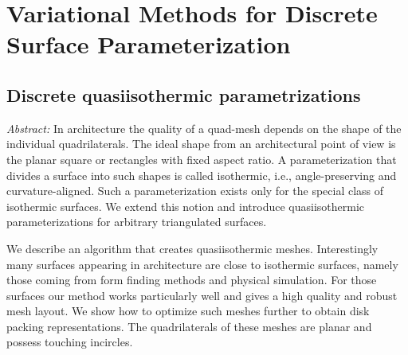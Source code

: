 \chapter{Variational Methods for Discrete Surface Parameterization}

\section{Discrete quasiisothermic parametrizations}

\emph{Abstract:} 
In architecture the quality of a quad-mesh depends on the shape of the individual
quadrilaterals. The ideal shape from an architectural point of view is the
planar square or rectangles with fixed aspect ratio. A parameterization that divides a
surface into such shapes is called isothermic, i.e., angle-preserving and
curvature-aligned. Such a parameterization exists only for the special class of
isothermic surfaces. We extend this notion and introduce quasiisothermic
parameterizations for arbitrary triangulated  surfaces.

We describe an algorithm that creates quasiisothermic meshes.
Interestingly many surfaces appearing in architecture are close to
isothermic surfaces, namely those coming from form finding methods and physical
simulation. For those surfaces our method works particularly well and gives a
high quality and robust mesh layout. We show how to optimize such meshes
further to obtain disk packing representations. The quadrilaterals of these
meshes are planar and possess touching incircles.

